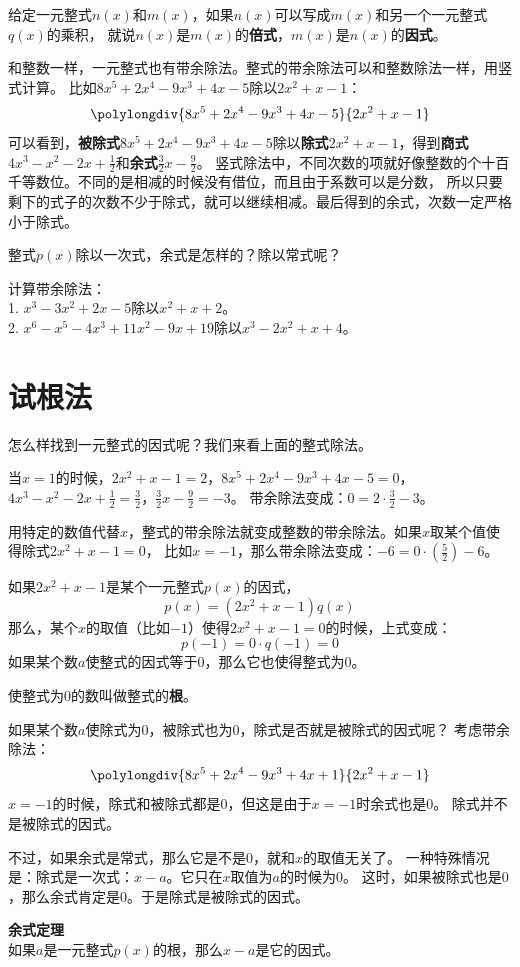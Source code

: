 \documentclass[12pt,UTF8,fontset=none]{ctexbook}
\begin{document}
给定一元整式$n(x)$和$m(x)$，如果$n(x)$可以写成$m(x)$和另一个一元整式$q(x)$的乘积，
就说$n(x)$是$m(x)$的\textbf{倍式}，$m(x)$是$n(x)$的\textbf{因式}。

和整数一样，一元整式也有带余除法。整式的带余除法可以和整数除法一样，用竖式计算。
比如$8x^5 +2x^4 -9x^3+ 4x-5$除以$2x^2+x-1$：
$$\polylongdiv{8x^5 +2x^4 -9x^3+ 4x-5}{2x^2+x-1}$$
可以看到，\textbf{被除式}$8x^5 +2x^4 -9x^3+ 4x-5$除以\textbf{除式}$2x^2+x-1$，得到\textbf{商式}$4x^3-x^2-2x+\frac12$和\textbf{余式}$\frac32 x- \frac92$。
竖式除法中，不同次数的项就好像整数的个十百千等数位。不同的是相减的时候没有借位，而且由于系数可以是分数，
所以只要剩下的式子的次数不少于除式，就可以继续相减。最后得到的余式，次数一定严格小于除式。
\begin{sk}\label{sk:2-0-0}
    整式$p(x)$除以一次式，余式是怎样的？除以常式呢？
\end{sk}
\begin{xt}\label{xt:2-0-0}
    计算带余除法：\\
    1. $x^3 - 3x^2 + 2x - 5$除以$x^2 + x + 2$。\\
    2. $x^6 - x^5 - 4x^3 + 11x^2 - 9x + 19$除以$x^3 - 2x^2 + x + 4$。
\end{xt}

\section{试根法}
怎么样找到一元整式的因式呢？我们来看上面的整式除法。

当$x=1$的时候，$2x^2+x-1 = 2$，$8x^5 +2x^4 -9x^3+ 4x-5 = 0$，
$4x^3-x^2-2x+\frac12 = \frac32$，$\frac32 x- \frac92 = -3$。
带余除法变成：$0 = 2 \cdot \frac32 - 3$。

用特定的数值代替$x$，整式的带余除法就变成整数的带余除法。如果$x$取某个值使得除式$2x^2 + x - 1 = 0$，
比如$x = -1$，那么带余除法变成：$-6 = 0\cdot \left(\frac52\right) - 6$。

如果$2x^2 + x - 1$是某个一元整式$p(x)$的因式，
$$ p(x) = (2x^2 + x - 1)q(x)$$
那么，某个$x$的取值（比如$-1$）使得$2x^2 + x - 1 = 0$的时候，上式变成：
$$ p(-1) = 0 \cdot q(-1) = 0$$
如果某个数$a$使整式的因式等于$0$，那么它也使得整式为$0$。

使整式为$0$的数叫做整式的\textbf{根}。

如果某个数$a$使除式为$0$，被除式也为$0$，除式是否就是被除式的因式呢？
考虑带余除法：
$$\polylongdiv{8x^5 +2x^4 -9x^3+ 4x+1}{2x^2+x-1}$$
$x = -1$的时候，除式和被除式都是$0$，但这是由于$x = -1$时余式也是$0$。
除式并不是被除式的因式。

不过，如果余式是常式，那么它是不是$0$，就和$x$的取值无关了。
一种特殊情况是：除式是一次式：$x - a$。它只在$x$取值为$a$的时候为$0$。
这时，如果被除式也是$0$，那么余式肯定是$0$。于是除式是被除式的因式。
\begin{tm}\textbf{余式定理}\label{tm:2-1-0}
    \mbox{} \\
    如果$a$是一元整式$p(x)$的根，那么$x-a$是它的因式。
\end{tm}
\end{document}
